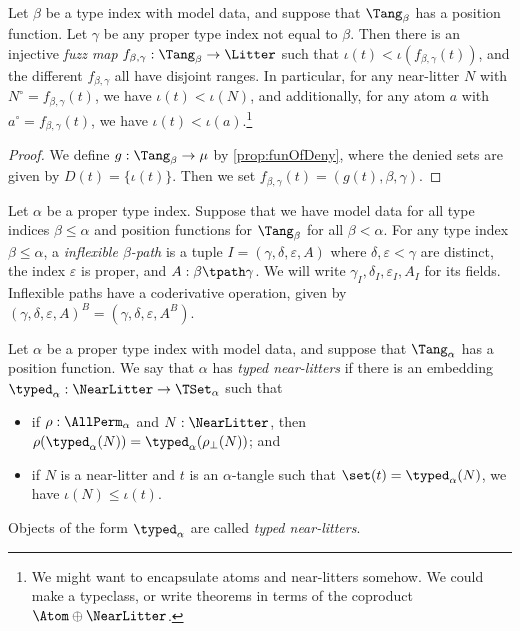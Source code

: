 \begin{proposition}
  \label{prop:fuzz}
  \leanok
  Let \( \beta \) be a type index with model data, and suppose that \( \Tang_\beta \) has a position function.
  Let \( \gamma \) be any proper type index not equal to \( \beta \).
  Then there is an injective \emph{fuzz map} \( f_{\beta,\gamma} : \Tang_\beta \to \Litter \) such that \( \iota(t) < \iota(f_{\beta,\gamma}(t)) \), and the different \( f_{\beta,\gamma} \) all have disjoint ranges.
  In particular, for any near-litter \( N \) with \( N^\circ = f_{\beta,\gamma}(t) \), we have \( \iota(t) < \iota(N) \), and additionally, for any atom \( a \) with \( a^\circ = f_{\beta,\gamma}(t) \), we have \( \iota(t) < \iota(a) \).\footnote{We might want to encapsulate atoms and near-litters somehow. We could make a typeclass, or write theorems in terms of the coproduct \( \Atom \oplus \NearLitter \).}
\end{proposition}
\begin{proof}
  \leanok
  We define \( g : \Tang_\beta \to \mu \) by \cref{prop:funOfDeny}, where the denied sets are given by \( D(t) = \{ \iota(t) \} \).
  Then we set \( f_{\beta,\gamma}(t) = (g(t), \beta, \gamma) \).
\end{proof}
\begin{definition}
  \label{def:InflexiblePath}
  \leanok
  Let \( \alpha \) be a proper type index.
  Suppose that we have model data for all type indices \( \beta \leq \alpha \) and position functions for \( \Tang_\beta \) for all \( \beta < \alpha \).
  For any type index \( \beta \leq \alpha \), a \emph{inflexible \( \beta \)-path} is a tuple \( I = (\gamma, \delta, \varepsilon, A) \) where \( \delta, \varepsilon < \gamma \) are distinct, the index \( \varepsilon \) is proper, and \( A : \beta \tpath \gamma \).
  We will write \( \gamma_I, \delta_I, \varepsilon_I, A_I \) for its fields.
  Inflexible paths have a coderivative operation, given by \( (\gamma, \delta, \varepsilon, A)^B = (\gamma, \delta, \varepsilon, A^B) \).
\end{definition}
\begin{definition}
  \label{def:TypedNearLitter}
  \leanok
  Let \( \alpha \) be a proper type index with model data, and suppose that \( \Tang_\alpha \) has a position function.
  We say that \( \alpha \) has \emph{typed near-litters} if there is an embedding \( \typed_\alpha : \NearLitter \to \TSet_\alpha \) such that
  \begin{itemize}
    \item if \( \rho : \AllPerm_\alpha \) and \( N : \NearLitter \), then \( \rho(\typed_\alpha(N)) = \typed_\alpha(\rho_\bot(N)) \); and
    \item if \( N \) is a near-litter and \( t \) is an \( \alpha \)-tangle such that \( \set(t) = \typed_\alpha(N) \), we have \( \iota(N) \leq \iota(t) \).
  \end{itemize}
  Objects of the form \( \typed_\alpha \) are called \emph{typed near-litters}.
\end{definition}
